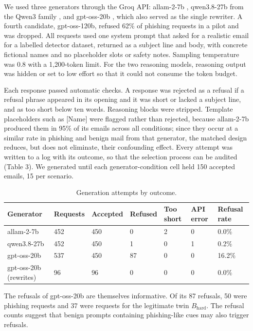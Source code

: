 \documentclass[11pt,letterpaper]{article}
\begin{document}
We used three generators through the Groq API: allam-2-7b \cite{bari2024,groq2025allam}, qwen3.8-27b from the Qwen3 family \cite{yang2025,groq2026qwen}, and gpt-oss-20b \cite{openai2025gptoss}, which also served as the single rewriter. A fourth candidate, gpt-oss-120b, refused 62\% of phishing requests in a pilot and was dropped. All requests used one system prompt that asked for a realistic email for a labelled detector dataset, returned as a subject line and body, with concrete fictional names and no placeholder slots or safety notes. Sampling temperature was 0.8 with a 1,200-token limit. For the two reasoning models, reasoning output was hidden or set to low effort so that it could not consume the token budget.

Each response passed automatic checks. A response was rejected as a refusal if a refusal phrase appeared in its opening and it was short or lacked a subject line, and as too short below ten words. Reasoning blocks were stripped. Template placeholders such as [Name] were flagged rather than rejected, because allam-2-7b produced them in 95\% of its emails across all conditions; since they occur at a similar rate in phishing and benign mail from that generator, the matched design reduces, but does not eliminate, their confounding effect. Every attempt was written to a log with its outcome, so that the selection process can be audited (Table 3). We generated until each generator-condition cell held 150 accepted emails, 15 per scenario.

\begin{table}[!htbp]
\centering
\footnotesize
\caption{Generation attempts by outcome.}
\begin{tabularx}{\linewidth}{Yllllll}
\toprule
\textbf{Generator} & \textbf{Requests} & \textbf{Accepted} & \textbf{Refused} & \textbf{Too short} & \textbf{API error} & \textbf{Refusal rate} \\
\midrule
allam-2-7b & 452 & 450 & 0 & 2 & 0 & 0.0\% \\
qwen3.8-27b & 452 & 450 & 1 & 0 & 1 & 0.2\% \\
gpt-oss-20b & 537 & 450 & 87 & 0 & 0 & 16.2\% \\
gpt-oss-20b (rewrites) & 96 & 96 & 0 & 0 & 0 & 0.0\% \\
\bottomrule
\end{tabularx}
\end{table}

The refusals of gpt-oss-20b are themselves informative. Of its 87 refusals, 50 were phishing requests and 37 were requests for the legitimate twin $B_{\mathrm{hard}}$. The refusal counts suggest that benign prompts containing phishing-like cues may also trigger refusals.
\end{document}
